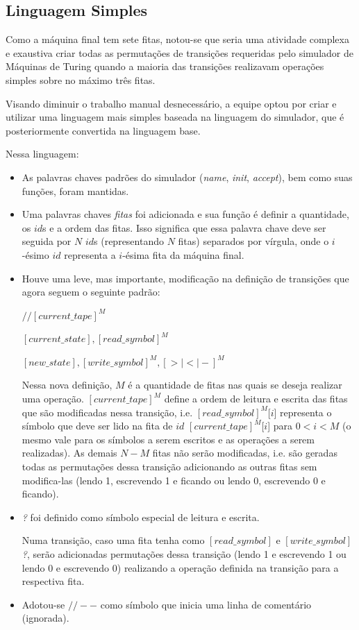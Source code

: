 \documentclass[a4paper]{article}
\begin{document}
\subsection{Linguagem Simples}

Como a máquina final tem sete fitas, notou-se que seria uma atividade complexa e exaustiva criar todas as permutações de transições requeridas pelo simulador de Máquinas de Turing quando a maioria das transições realizavam operações simples sobre no máximo três fitas.

Visando diminuir o trabalho manual desnecessário, a equipe optou por criar e utilizar uma linguagem mais simples baseada na linguagem do simulador, que é posteriormente convertida na linguagem base.

Nessa linguagem:
\begin{itemize}
    \item As palavras chaves padrões do simulador (\textit{name}, \textit{init}, \textit{accept}), bem como suas funções, foram mantidas.
    \item Uma palavras chaves \textit{fitas} foi adicionada e sua função é definir a quantidade, os $id$s e a ordem das fitas. Isso significa que essa palavra chave deve ser seguida por $N$ $id$s (representando $N$ fitas) separados por vírgula, onde o $i$-ésimo $id$ representa a $i$-ésima fita da máquina final.
    \item Houve uma leve, mas importante, modificação na definição de transições que agora seguem o seguinte padrão:

    $//[current\_tape]^M$

    $[current\_state],[read\_symbol]^M$

    $[new\_state],[write\_symbol]^M,[>|<|-]^M$
    
    Nessa nova definição, $M$ é a quantidade de fitas nas quais se deseja realizar uma operação. $[current\_tape]^M$ define a ordem de leitura e escrita das fitas que são modificadas nessa transição, i.e. $[read\_symbol]^M$[$i$] representa o símbolo que deve ser lido na fita de $id$ $[current\_tape]^M$[$i$] para $0 < i < M$ (o mesmo vale para os símbolos a serem escritos e as operações a serem realizadas). As demais $N-M$ fitas não serão modificadas, i.e. são geradas todas as permutações dessa transição adicionando as outras fitas sem modifica-las (lendo 1, escrevendo 1 e ficando ou lendo 0, escrevendo 0 e ficando).
    \item \textit{?} foi definido como símbolo especial de leitura e escrita.
    
    Numa transição, caso uma fita tenha como $[read\_symbol]$ e $[write\_symbol]$ \textit{?}, serão adicionadas permutações dessa transição (lendo 1 e escrevendo 1 ou lendo 0 e escrevendo 0) realizando a operação definida na transição para a respectiva fita.
    \item Adotou-se $//--$ como símbolo que inicia uma linha de comentário (ignorada).
\end{itemize}
\end{document}
